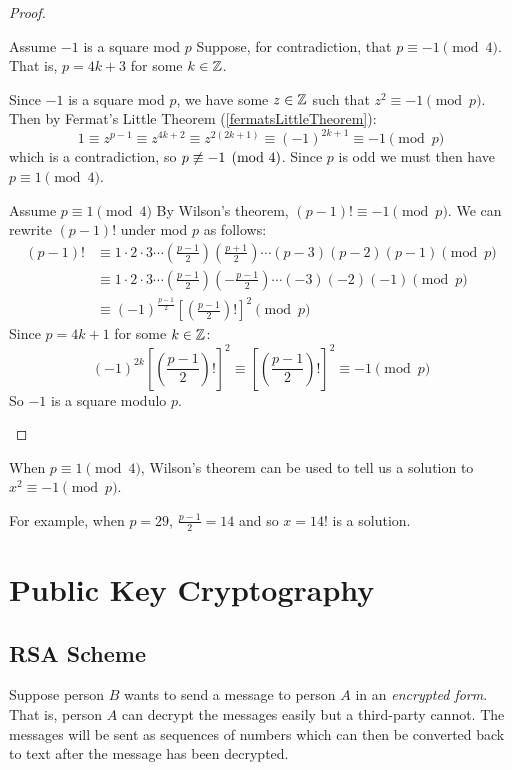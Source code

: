 \documentclass[../main.tex]{subfiles}
\begin{document}
\begin{proof}
  \begin{proofdirection}{Assume $-1$ is a square mod $p$}
    Suppose, for contradiction, that $p \equiv -1 \pmod{4}$.
    That is, $p = 4k + 3$ for some $k \in \mathbb{Z}$.

    Since $-1$ is a square mod $p$, we have some $z \in \mathbb{Z}$ such that $z^2 \equiv -1 \pmod{p}$.
    Then by Fermat's Little Theorem (\cref{fermatsLittleTheorem}):
    \[
      1 \equiv z^{p - 1} \equiv z^{4k + 2} \equiv z^{2(2k + 1)} \equiv (-1)^{2k + 1} \equiv -1 \pmod{ p}
    \]
    which is a contradiction, so $p \centernot\equiv -1 \pmod{4}$.
    Since $p$ is odd we must then have $p \equiv 1 \pmod{4}$.
  \end{proofdirection}
  \begin{proofdirection}{Assume $p \equiv 1 \pmod{4}$}
    By Wilson's theorem, $(p - 1)! \equiv -1 \pmod{p}$.
    We can rewrite $(p - 1)!$ under mod $p$ as follows:
    \begin{align*}
      (p - 1)! &\equiv 1 \cdot 2 \cdot 3 \cdots \left(\frac{p - 1}{2}\right)\left(\frac{p + 1}{2}\right) \cdots (p - 3)(p - 2)(p-1) \pmod{p} \\
               &\equiv 1 \cdot 2 \cdot 3 \cdots \left(\frac{p - 1}{2}\right)\left(-\frac{p - 1}{2}\right)\cdots(-3)(-2)(-1) \pmod{p} \\
               &\equiv (-1)^{\frac{p-1}{2}}\left[\left(\frac{p - 1}{2}\right)!\right]^2 \pmod{p}
    \end{align*}
    Since $p = 4k + 1$ for some $k \in \mathbb{Z}$:
    \[
      (-1)^{2k}\left[\left(\frac{p - 1}{2}\right)!\right]^2 \equiv \left[\left(\frac{p - 1}{2}\right)!\right]^2 \equiv -1 \pmod{p}
    \]
    So $-1$ is a square modulo $p$.
  \end{proofdirection}
\end{proof}
\begin{remark}
  When $p \equiv 1 \pmod{4}$, Wilson's theorem can be used to tell us a solution to $x^2 \equiv -1 \pmod{p}$.

  For example, when $p = 29$, $\frac{p - 1}{2} = 14$ and so $x = 14!$ is a solution.
\end{remark}

\section{Public Key Cryptography}
\subsection{RSA Scheme}
Suppose person $B$ wants to send a message to person $A$ in an \textit{encrypted form}.
That is, person $A$ can decrypt the messages easily but a third-party cannot.
The messages will be sent as sequences of numbers which can then be converted back to text after the message has been decrypted.
\end{document}

